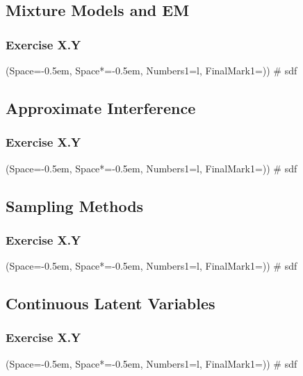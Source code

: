 \documentclass[12pt, a4paper]{article}
\newcommand{\listSpace}{-0.5em}%
\begin{document}
\subsection{Mixture Models and EM}
\subsubsection*{Exercise X.Y}
\begin{easylist}[enumerate]
	\ListProperties(Space=\listSpace, Space*=\listSpace, Numbers1=l, FinalMark1={)})
	# sdf
\end{easylist}

\subsection{Approximate Interference}
\subsubsection*{Exercise X.Y}
\begin{easylist}[enumerate]
	\ListProperties(Space=\listSpace, Space*=\listSpace, Numbers1=l, FinalMark1={)})
	# sdf
\end{easylist}

\subsection{Sampling Methods}
\subsubsection*{Exercise X.Y}
\begin{easylist}[enumerate]
	\ListProperties(Space=\listSpace, Space*=\listSpace, Numbers1=l, FinalMark1={)})
	# sdf
\end{easylist}

\subsection{Continuous Latent Variables}
\subsubsection*{Exercise X.Y}
\begin{easylist}[enumerate]
	\ListProperties(Space=\listSpace, Space*=\listSpace, Numbers1=l, FinalMark1={)})
	# sdf
\end{easylist}
\end{document}
